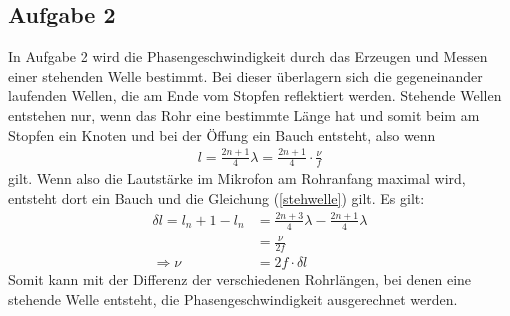\documentclass[11pt, a4paper]{article}
\begin{document}
    \subsection{Aufgabe 2}
    In Aufgabe 2 wird die Phasengeschwindigkeit durch das Erzeugen und Messen 
    einer stehenden Welle bestimmt. Bei dieser überlagern sich die gegeneinander laufenden Wellen,
    die am Ende vom Stopfen reflektiert werden. Stehende Wellen entstehen nur, wenn das Rohr eine bestimmte Länge hat
    und somit beim am Stopfen ein Knoten und bei der Öffung ein Bauch entsteht, also wenn
    \begin{align} \label{stehwelle}
        l = \frac{2n+1}{4} \lambda = \frac{2n + 1}{4} \cdot \frac{\nu}{f}
    \end{align}
    gilt. Wenn also die Lautstärke im Mikrofon am Rohranfang maximal wird, entsteht dort ein Bauch und die Gleichung
    (\ref{stehwelle}) gilt. Es gilt: 
    \begin{align}
        \delta l = l_n+1 - l_n &= \frac{2n+3}{4} \lambda - \frac{2n+1}{4} \lambda \nonumber \\
        &= \frac{\nu}{2f} \nonumber \\
         \Rightarrow \nu &= 2f \cdot \delta l
    \end{align}
    Somit kann mit der Differenz der verschiedenen Rohrlängen, bei denen eine stehende Welle 
    entsteht, die Phasengeschwindigkeit ausgerechnet werden.
\end{document}
